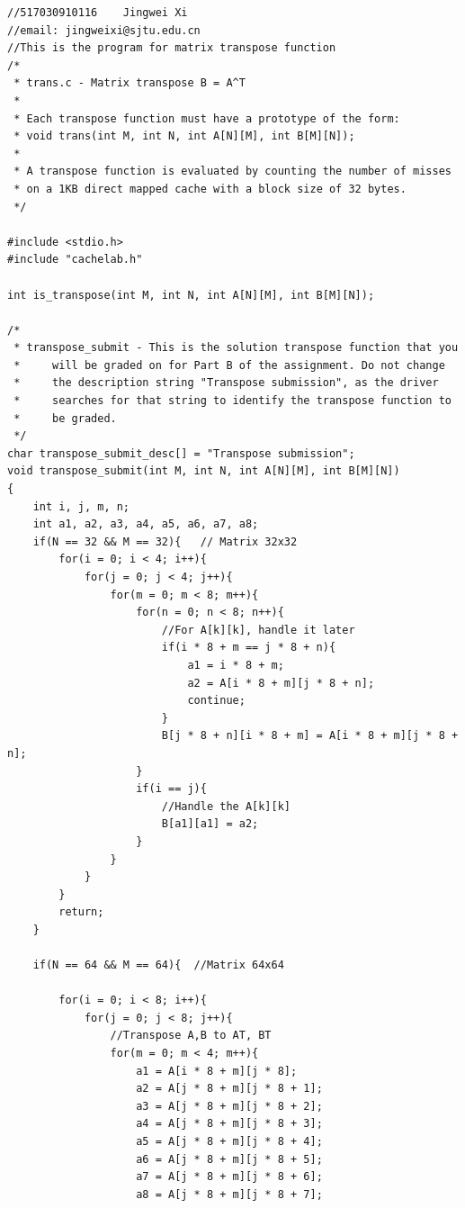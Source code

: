 \documentclass{article}
\begin{document}
\begin{lstlisting}[title=trans.c, frame=shadowbox]
//517030910116    Jingwei Xi
//email: jingweixi@sjtu.edu.cn
//This is the program for matrix transpose function
/* 
 * trans.c - Matrix transpose B = A^T
 *
 * Each transpose function must have a prototype of the form:
 * void trans(int M, int N, int A[N][M], int B[M][N]);
 *
 * A transpose function is evaluated by counting the number of misses
 * on a 1KB direct mapped cache with a block size of 32 bytes.
 */ 

#include <stdio.h>
#include "cachelab.h"

int is_transpose(int M, int N, int A[N][M], int B[M][N]);

/* 
 * transpose_submit - This is the solution transpose function that you
 *     will be graded on for Part B of the assignment. Do not change
 *     the description string "Transpose submission", as the driver
 *     searches for that string to identify the transpose function to
 *     be graded. 
 */
char transpose_submit_desc[] = "Transpose submission";
void transpose_submit(int M, int N, int A[N][M], int B[M][N])
{
    int i, j, m, n;
    int a1, a2, a3, a4, a5, a6, a7, a8;
    if(N == 32 && M == 32){   // Matrix 32x32
        for(i = 0; i < 4; i++){
            for(j = 0; j < 4; j++){
                for(m = 0; m < 8; m++){
                    for(n = 0; n < 8; n++){
                        //For A[k][k], handle it later
                        if(i * 8 + m == j * 8 + n){
                            a1 = i * 8 + m;
                            a2 = A[i * 8 + m][j * 8 + n];
                            continue;
                        }
                        B[j * 8 + n][i * 8 + m] = A[i * 8 + m][j * 8 + n];
                    }
                    if(i == j){
                        //Handle the A[k][k]
                        B[a1][a1] = a2;  
                    }
                }
            }
        }
        return;
    }

    if(N == 64 && M == 64){  //Matrix 64x64
        
        for(i = 0; i < 8; i++){
            for(j = 0; j < 8; j++){
                //Transpose A,B to AT, BT
                for(m = 0; m < 4; m++){
                    a1 = A[i * 8 + m][j * 8]; 
                    a2 = A[j * 8 + m][j * 8 + 1];
                    a3 = A[j * 8 + m][j * 8 + 2]; 
                    a4 = A[j * 8 + m][j * 8 + 3];
                    a5 = A[j * 8 + m][j * 8 + 4]; 
                    a6 = A[j * 8 + m][j * 8 + 5];
                    a7 = A[j * 8 + m][j * 8 + 6]; 
                    a8 = A[j * 8 + m][j * 8 + 7];


\end{lstlisting}
\end{document}
